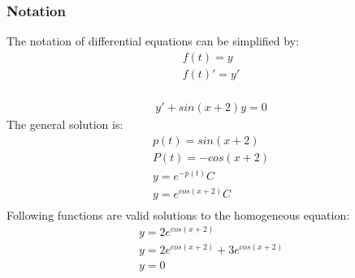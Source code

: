 \subsubsection{Notation}
The notation of differential equations can be simplified by: 
\begin{gather*}
    f(t) = y\\
    f(t)' = y'\\
\end{gather*}
\begin{example}
    \begin{gather*}
       y' + sin(x + 2)y = 0 
    \end{gather*}
    The general solution is: 
    \begin{gather*}
       p(t) = sin(x + 2) \\
       P(t) = - cos(x + 2)\\
       y =  e^{-p(t)} C \\
       y =  e^{cos(x + 2)} C \\
    \end{gather*} 
    Following functions are valid solutions to the homogeneous equation: 
    \begin{gather*}
       y =  2e^{cos(x + 2)} \\
       y =  2e^{cos(x + 2)} +  3e^{cos(x + 2)} \\
       y = 0 \\ 
    \end{gather*}
\end{example}
